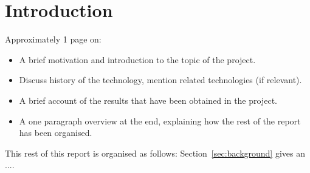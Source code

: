 \section{Introduction}
\label{sec:introduction}

Approximately 1 page on:

\begin{itemize}
  
\item A brief motivation and introduction to the topic of the project.

\item Discuss history of the technology, mention related technologies (if relevant).

\item A brief account of the results that have been obtained in the project.

\item A one paragraph overview at the end, explaining how the rest of
  the report has been organised.

\end{itemize}

\noindent
This rest of this report is organised as follows:
Section~\ref{sec:background} gives an ....

